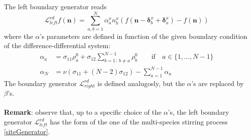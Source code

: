 \documentclass[10pt]{article}
\numberwithin{equation}{section}
\numberwithin{equation}{subsection}
\begin{document}
The left boundary generator reads
\begin{equation}
	\mathcal{L}_{left}^{rd}f(\bm{n})=\sum_{a,b=1}^{N}\alpha_{a}^{x}n_{b}^{x}\left(f(\bm{n}-\bm{\delta}_{b}^{x}+\bm{\delta}_{a}^{x})-f(\bm{n})\right)
\end{equation}
where the $\alpha$'s parameters are defined in function of the given boundary condition of the difference-differential system:
\begin{equation}\label{boundaryParamRD}
	\begin{split}
		\alpha_{a}&=\sigma_{11}\rho_{a}^{0}+\sigma_{12}\sum_{b=1\,:\,b\neq a}^{N-1}\rho_{b}^{0}\qquad \text{if} \quad a\in \{1,\ldots,N-1\}\\
		\alpha_{N}&=\nu\left(\sigma_{11}+(N-2)\sigma_{12}\right)-\sum_{a=1}^{N-1}\alpha_{a}
	\end{split}
\end{equation}
The boundary generator $\mathcal{L}_{right}^{rd}$ is defined analugosly, but the $\alpha$'s are replaced by $\beta$'s. \\ \\
\textbf{Remark}: observe that, up to a specific choice of the $\alpha$'s, the left boundary generator $\mathcal{L}_{left}^{rd}$ has the form of the one of the multi-species stirring process \eqref{siteGenerator}. 
\end{document}

